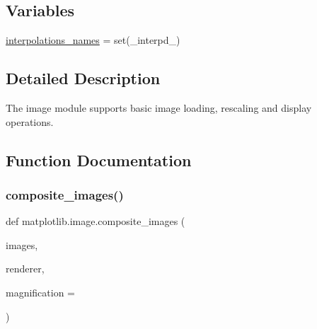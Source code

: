 \subsection*{Variables}
\begin{DoxyCompactItemize}
\item 
\hyperlink{namespacematplotlib_1_1image_a9ce609a0506b1fe66055be71a42bdd0d}{interpolations\+\_\+names} = set(\+\_\+interpd\+\_\+)
\end{DoxyCompactItemize}


\subsection{Detailed Description}
\begin{DoxyVerb}The image module supports basic image loading, rescaling and display
operations.
\end{DoxyVerb}
 

\subsection{Function Documentation}
\mbox{\label{namespacematplotlib_1_1image_a3b7ffb382d966856338cedc8ced3a15d}} 
\subsubsection{\texorpdfstring{composite\+\_\+images()}{composite\_images()}}
{\footnotesize\ttfamily def matplotlib.\+image.\+composite\+\_\+images (\begin{DoxyParamCaption}\item[{}]{images,  }\item[{}]{renderer,  }\item[{}]{magnification = {} }\end{DoxyParamCaption})}

